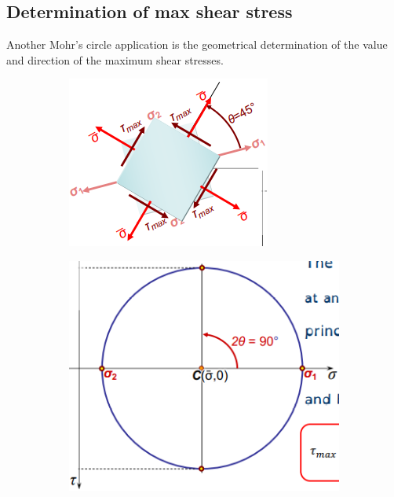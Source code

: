 \documentclass[class=report, crop=false, 12pt,a4paper]{standalone}
\begin{document}
\subsection{Determination of max shear stress}
Another Mohr's circle application is the geometrical determination of the value and direction of the maximum shear stresses.
\begin{figure}
    \begin{minipage}{0.49\textwidth}
        \begin{figure}[H]
            \centering
            \includegraphics[width = \textwidth]{../img/diagram59.png}
        \end{figure}
    \end{minipage}
    \begin{minipage}{0.5\textwidth}
        \begin{figure}[H]
            \centering
            \includegraphics[width = \textwidth]{../img/diagram58.png}
        \end{figure}
    \end{minipage}
    \caption{}
\end{figure}
\end{document}

